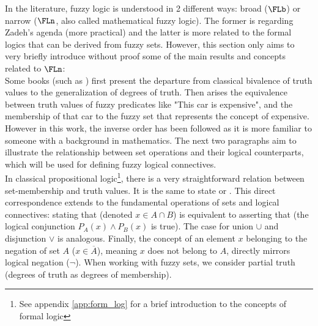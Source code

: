 In the literature\cite{HistoryFL2017}, fuzzy logic is understood in 2 different ways: broad ($\FLb$) or narrow ($\FLn$, also called mathematical fuzzy logic). The former is regarding Zadeh's agenda (more practical) and the latter is more related to the formal logics that can be derived from fuzzy sets. However, this section only aims to very briefly introduce without proof some of the main results and concepts related to $\FLn$: \\

Some books (such as \cite{HistoryFL2017}) first present the departure from classical bivalence of truth values to the generalization of degrees of truth. Then arises the equivalence between truth values of fuzzy predicates like "This car is expensive", and the membership of that car to the fuzzy set that represents the concept of expensive. However in this work, the inverse order has been followed as it is more familiar to someone with a background in mathematics. The next two paragraphs aim to illustrate the relationship between set operations and their logical counterparts, which will be used for defining fuzzy logical connectives.\\


In classical propositional logic\footnote{See appendix \ref{app:form_log} for a brief introduction to the concepts of formal logic}, there is a very straightforward relation between set-membership and truth values. It is the same to state  or . This direct correspondence extends to the fundamental operations of sets and logical connectives: stating that  (denoted $x \in A \cap B$) is equivalent to asserting that  (the logical conjunction $P_A(x) \land P_B(x)$ is true). The case for union $\cup$ and disjunction $\lor$ is analogous. Finally, the concept of an element $x$ belonging to the negation of set $A$ ($x \in \overline{A}$), meaning $x$ does not belong to $A$, directly mirrors logical negation ($\neg$). When working with fuzzy sets, we consider partial truth (degrees of truth as degrees of membership).\\

